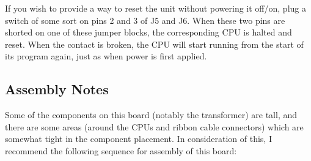 \documentclass[12pt]{article}
\begin{document}
If you wish to provide a way to reset the unit without powering it off/on,
plug a switch of some sort on pins 2 and 3 of J5 and J6.  When these two 
pins are shorted on one of these jumper blocks, the corresponding CPU is
halted and reset.  When the contact is broken, the CPU will start running
from the start of its program again, just as when power is first applied.

\subsection{Assembly Notes}
Some of the components on this board (notably the transformer) are tall, and
there are some areas (around the CPUs and ribbon cable connectors) which are
somewhat tight in the component placement.  In consideration of this, I
recommend the following sequence for assembly of this board:
\end{document}
